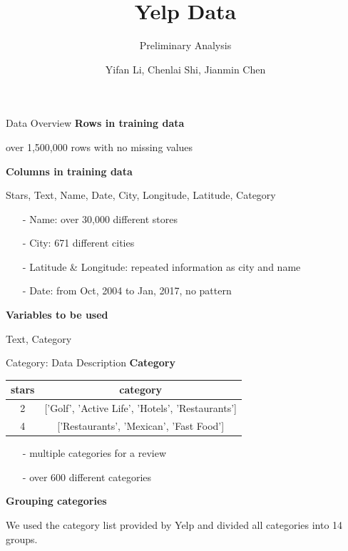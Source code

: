 \documentclass[10pt]{beamer}
\title{Yelp Data}
\subtitle{Preliminary Analysis}
\date{}
\author{Yifan Li, Chenlai Shi, Jianmin Chen}
\institute{Monday Group 1}
\begin{document}
\maketitle

\begin{frame}{Data Overview}
\textbf{Rows in training data} 

over 1,500,000 rows with no missing values

\textbf{Columns in training data}

Stars, Text, Name, Date, City, Longitude, Latitude, Category 
\begin{itemize}
    \item[-] Name: over 30,000 different stores
    \item[-] City: 671 different cities
    \item[-] Latitude \& Longitude: repeated information as city and name
    \item[-] Date: from Oct, 2004 to Jan, 2017, no pattern
\end{itemize}

\textbf{Variables to be used}

Text, Category
\end{frame}

\begin{frame}{Category: Data Description}
\textbf{Category}

\begin{table}
\centering
\label{my-label}
\begin{tabular}{c|c}
\hline
stars & category          \\
\hline
2     & {[}'Golf', 'Active Life', 'Hotels', 'Restaurants'{]}    \\
\hline
4     & {[}'Restaurants', 'Mexican', 'Fast Food'{]} \\
\hline
\end{tabular}
\end{table}
\begin{itemize}
    \item[-] multiple categories for a review
    \item[-] over 600 different categories
\end{itemize}
\textbf{Grouping categories}

We used the category list provided by Yelp and divided all categories into 14 groups. 
\end{frame}
\end{document}
